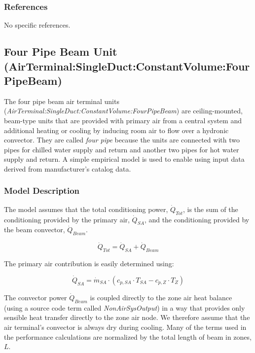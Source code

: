 \subsubsection{References}\label{references-3}

No specific references.

\subsection{Four Pipe Beam Unit (AirTerminal:SingleDuct:ConstantVolume:FourPipeBeam)}\label{four-pipe-beam-unit-airterminalsingleductconstantvolumefourpipebeam}

The four pipe beam air terminal units (\emph{AirTerminal:SingleDuct:ConstantVolume:FourPipeBeam}) are ceiling-mounted, beam-type units that are provided with primary air from a central system and additional heating or cooling by inducing room air to flow over a hydronic convector. They are called \emph{four pipe} because the units are connected with two pipes for chilled water supply and return and another two pipes for hot water supply and return. A simple empirical model is used to enable using input data derived from manufacturer's catalog data.

\subsubsection{Model Description}\label{model-description-1-000}

The model assumes that the total conditioning power, \({\dot Q_{Tot}}\), is the sum of the conditioning provided by the primary air, \({\dot Q_{SA}}\), and the conditioning provided by the beam convector, \({\dot Q_{Beam}}\).

\begin{equation}
{\dot Q_{Tot}} = {{\dot Q_{SA}} + {\dot Q_{Beam}}}
\end{equation}

The primary air contribution is easily determined using:

\begin{equation}
{\dot Q_{SA}} = {{\dot m_{SA}}\cdot ({c_{p,SA}} \cdot {T_{SA}} - {c_{p,Z}} \cdot {T_{Z}})}
\end{equation}

The convector power \({\dot Q_{Beam}}\) is coupled directly to the zone air heat balance (using a source code term called \emph{NonAirSysOutput}) in a way that provides only sensible heat transfer directly to the zone air node. We therefore assume that the air terminal's convector is always dry during cooling. Many of the terms used in the performance calculations are normalized by the total length of beam in zones, \({L}\).

